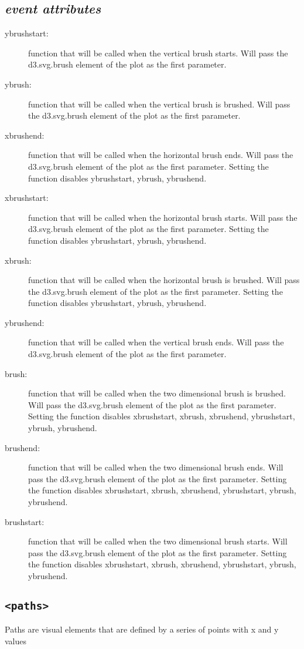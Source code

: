 \subsection*{\emph{event attributes}}
\begin{description}
\item[ybrushstart:]{function that will be called when the vertical brush starts.  Will pass the d3.svg.brush element of the plot as the first parameter.}
\item[ybrush:]{function that will be called when the vertical brush is brushed.  Will pass the d3.svg.brush element of the plot as the first parameter.}
\item[xbrushend:]{function that will be called when the horizontal brush ends.  Will pass the d3.svg.brush element of the plot as the first parameter.  Setting the function disables ybrushstart, ybrush, ybrushend.}
\item[xbrushstart:]{function that will be called when the horizontal brush starts.  Will pass the d3.svg.brush element of the plot as the first parameter.  Setting the function disables ybrushstart, ybrush, ybrushend.}
\item[xbrush:]{function that will be called when the horizontal brush is brushed.  Will pass the d3.svg.brush element of the plot as the first parameter.  Setting the function disables ybrushstart, ybrush, ybrushend.}
\item[ybrushend:]{function that will be called when the vertical brush ends.  Will pass the d3.svg.brush element of the plot as the first parameter.}
\item[brush:]{function that will be called when the two dimensional brush is brushed.  Will pass the d3.svg.brush element of the plot as the first parameter.  Setting the function disables xbrushstart, xbrush, xbrushend, ybrushstart, ybrush, ybrushend.}
\item[brushend:]{function that will be called when the two dimensional brush ends.  Will pass the d3.svg.brush element of the plot as the first parameter.  Setting the function disables xbrushstart, xbrush, xbrushend, ybrushstart, ybrush, ybrushend.}
\item[brushstart:]{function that will be called when the two dimensional brush starts.  Will pass the d3.svg.brush element of the plot as the first parameter.  Setting the function disables xbrushstart, xbrush, xbrushend, ybrushstart, ybrush, ybrushend.}
\end{description}
\clearpage \noindent \hrulefill
\subsection*{{\tt <paths>}}
\hrulefill\newline
 Paths are visual elements that are defined by a series of points with x and y values

